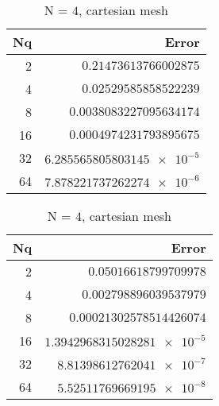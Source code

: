 \documentclass[11pt]{scrartcl}
\begin{document}
\begin{table}[H]
	\parbox{.45\linewidth}{
		\centering
		\begin{tabular}{|r|r|}
			\hline\hline
			\textbf{Nq} & \textbf{Error} \\\hline
			2 & $\num{0.21473613766002875}$   \\
			4 & $\num{0.02529585858522239}$  \\
			8 & $\num{0.0038083227095634174}$ \\
			16 & $\num{0.0004974231793895675}$ \\
			32 & $\num{6.285565805803145e-5}$ \\
			64 & $\num{7.878221737262274e-6}$ \\\hline
		\end{tabular}
		\caption{N = $3$, cartesian mesh}
	}
	\hspace{0.5cm}
	\parbox{.45\linewidth}{
		\centering
		\begin{tabular}{|r|r|}
			\hline\hline
			\textbf{Nq} & \textbf{Error} \\\hline
			2 & $\num{0.05016618799709978}$   \\
			4 & $\num{0.002798896039537979}$  \\
			8 & $\num{0.00021302578514426074}$ \\
			16 & $\num{1.3942968315028281e-5}$ \\
			32 & $\num{8.81398612762041e-7}$ \\
			64 & $\num{5.52511769669195e-8}$ \\\hline
		\end{tabular}
		\caption{N = $4$, cartesian mesh}
	}
\end{table}
\end{document}
